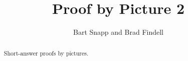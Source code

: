 \documentclass[nooutcomes]{ximera}
\title{Proof by Picture 2}
\author{Bart Snapp and Brad Findell}
\begin{document}
\begin{abstract}
Short-answer proofs by pictures. 
\end{abstract}
\maketitle


%
\end{document}

